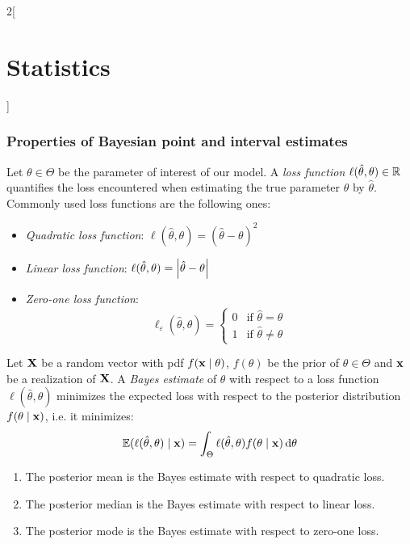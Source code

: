 \documentclass[../../../main.tex]{subfiles}
\begin{document}
\begin{multicols}{2}[\section{Statistics}]
  \subsubsection{Properties of Bayesian point and interval estimates}
  \begin{definition}
    Let $\theta\in\Theta$ be the parameter of interest of our model. A \emph{loss function} $\ell(\hat\theta,\theta)\in\mathbb{R}$ quantifies the loss encountered when estimating the true parameter $\theta$ by $\hat\theta$. Commonly used loss functions are the following ones:
    \begin{itemize}
      \item \emph{Quadratic loss function}: $\ell(\hat\theta,\theta)={(\hat\theta-\theta)}^2$
      \item \emph{Linear loss function}: $\ell(\hat\theta,\theta)=\abs{\hat\theta-\theta}$
      \item \emph{Zero-one loss function}: $$\ell_\varepsilon(\hat\theta,\theta)=
              \begin{cases}
                0 & \text{if }\hat\theta=\theta   \\
                1 & \text{if }\hat\theta\ne\theta
              \end{cases}$$
    \end{itemize}
  \end{definition}
  \begin{definition}
    Let $\boldsymbol{\mathrm{X}}$ be a random vector with pdf $f(\boldsymbol{\mathrm{x}}\mid \theta)$, $f(\theta)$ be the prior of $\theta\in\Theta$ and $\boldsymbol{\mathrm{x}}$ be a realization of $\boldsymbol{\mathrm{X}}$. A \emph{Bayes estimate} of $\theta$ with respect to a loss function $\ell(\hat\theta,\theta)$ minimizes the expected loss with respect to the posterior distribution $f(\theta\mid\boldsymbol{\mathrm{x}})$, i.e. it minimizes: $$\mathbb{E}(\ell(\hat\theta,\theta)\mid\boldsymbol{\mathrm{x}})=\int_\Theta\ell(\hat\theta,\theta)f(\theta\mid\boldsymbol{\mathrm{x}})\dd{\theta}$$
  \end{definition}
  \begin{proposition}
    \hfill
    \begin{enumerate}
      \item The posterior mean is the Bayes estimate with respect to quadratic loss.
      \item The posterior median is the Bayes estimate with respect to linear loss.
      \item The posterior mode is the Bayes estimate with respect to zero-one loss.
    \end{enumerate}
  \end{proposition}

\end{multicols}
\end{document}
